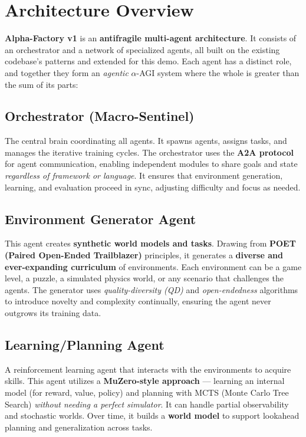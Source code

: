 \documentclass{article}
\begin{document}
\section{Architecture Overview}
\textbf{Alpha-Factory v1} is an \textbf{antifragile multi-agent architecture}. It consists of an orchestrator and a network of specialized agents, all built on the existing codebase’s patterns and extended for this demo. Each agent has a distinct role, and together they form an \emph{agentic} \(\alpha\)-AGI system where the whole is greater than the sum of its parts:

\subsection{Orchestrator (Macro-Sentinel)}
The central brain coordinating all agents. It spawns agents, assigns tasks, and manages the iterative training cycles. The orchestrator uses the \textbf{A2A protocol} for agent communication, enabling independent modules to share goals and state \emph{regardless of framework or language}. It ensures that environment generation, learning, and evaluation proceed in sync, adjusting difficulty and focus as needed.

\subsection{Environment Generator Agent}
This agent creates \textbf{synthetic world models and tasks}. Drawing from \textbf{POET (Paired Open-Ended Trailblazer)} principles, it generates a \textbf{diverse and ever-expanding curriculum} of environments. Each environment can be a game level, a puzzle, a simulated physics world, or any scenario that challenges the agents. The generator uses \emph{quality-diversity (QD)} and \emph{open-endedness} algorithms to introduce novelty and complexity continually, ensuring the agent never outgrows its training data.

\subsection{Learning/Planning Agent}
A reinforcement learning agent that interacts with the environments to acquire skills. This agent utilizes a \textbf{MuZero-style approach} — learning an internal model (for reward, value, policy) and planning with MCTS (Monte Carlo Tree Search) \emph{without needing a perfect simulator}. It can handle partial observability and stochastic worlds. Over time, it builds a \textbf{world model} to support lookahead planning and generalization across tasks.
\end{document}
